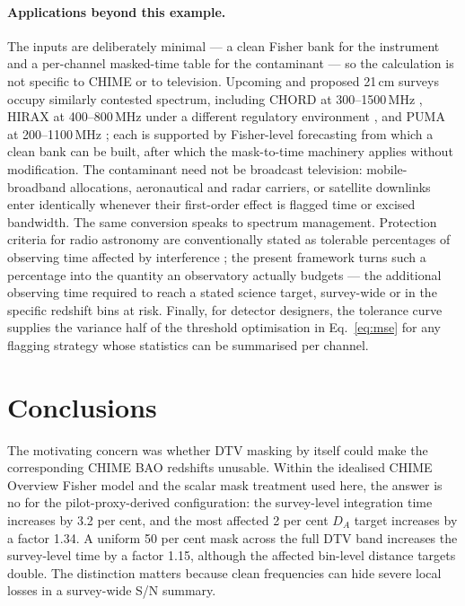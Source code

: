 \paragraph{Applications beyond this example.}
The inputs are deliberately minimal --- a clean Fisher bank for the
instrument and a per-channel masked-time table for the contaminant ---
so the calculation is not specific to CHIME or to television.
Upcoming and proposed 21\,cm surveys occupy similarly contested
spectrum, including CHORD at 300--1500\,MHz \citep{CHORD2019}, HIRAX
at 400--800\,MHz under a different regulatory environment
\citep{HIRAX2022}, and PUMA at 200--1100\,MHz \citep{PUMA2019}; each
is supported by Fisher-level forecasting from which a clean bank can
be built, after which the mask-to-time machinery applies without
modification. The contaminant need not be broadcast television:
mobile-broadband allocations, aeronautical and radar carriers, or
satellite downlinks enter identically whenever their first-order
effect is flagged time or excised bandwidth. The same conversion
speaks to spectrum management. Protection criteria for radio
astronomy are conventionally stated as tolerable percentages of
observing time affected by interference \citep{ITURRA769}; the
present framework turns such a percentage into the quantity an
observatory actually budgets --- the additional observing time
required to reach a stated science target, survey-wide or in the
specific redshift bins at risk. Finally, for detector designers, the
tolerance curve supplies the variance half of the threshold
optimisation in Eq.~\eqref{eq:mse} for any flagging strategy whose
statistics can be summarised per channel.

\section{Conclusions}
\label{sec:conclusions}

The motivating concern was whether DTV masking by itself could make the
corresponding CHIME BAO redshifts unusable. Within the idealised CHIME
Overview Fisher model and the scalar mask treatment used here, the
answer is no for the pilot-proxy-derived configuration: the
survey-level integration time increases by 3.2 per cent, and the most
affected 2 per cent $D_A$ target increases by a factor 1.34. A uniform
50 per cent mask across the full DTV band increases the survey-level
time by a factor 1.15, although the affected bin-level distance targets
double. The distinction matters because clean frequencies can hide
severe local losses in a survey-wide S/N summary.

